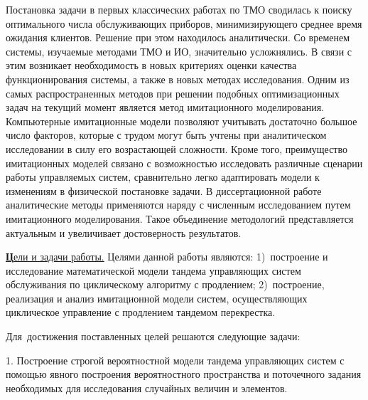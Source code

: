 \documentclass[14pt]{extarticle}
\newcommand{\progressTXT}{Степень разработанности темы.}
\newcommand{\aimTXT}{Цели и задачи работы.}
\newcommand{\tasksTXT}{задачи}
\newcommand{\noveltyTXT}{Научная новизна.}
\newcommand{\influenceTXT}{Теоретическая и практическая значимость.}
\newcommand{\methodsTXT}{Mетодология и методы исследования.}
\newcommand{\defpositionsTXT}{Основные положения, выносимые на~защиту.}
\newcommand{\reliabilityTXT}{Достоверность}
\newcommand{\probationTXT}{Степень достоверности и апробация результатов.}
\newcommand{\contributionTXT}{Личный вклад автора.}
\newcommand{\publicationsTXT}{Публикации.}
\theoremstyle{theorem}
\theoremstyle{remark}
\begin{document}
Постановка задачи в первых классических работах по ТМО сводилась к поиску оптимального числа обслуживающих приборов, минимизирующего среднее время ожидания клиентов. Решение при этом находилось аналитически. Со временем системы, изучаемые методами ТМО и ИО, значительно усложнялись. В связи с этим возникает необходимость в новых критериях оценки качества функционирования системы, а также в новых методах исследования. Одним из самых распространенных методов при решении подобных оптимизационных задач на текущий момент является метод имитационного моделирования. Компьютерные имитационные модели позволяют учитывать достаточно большое число факторов, которые с трудом могут быть учтены при аналитическом исследовании в силу его возрастающей сложности. Кроме того, преимущество имитационных моделей связано с возможностью исследовать различные сценарии работы управляемых систем, сравнительно легко адаптировать модели к изменениям в физической постановке задачи. В диссертационной работе аналитические методы применяются наряду с численным исследованием путем имитационного моделирования. Такое объединение методологий представляется актуальным и увеличивает достоверность результатов.
\newcommand{\progress}{\underline{\textbf{\progressTXT}}}
\newcommand{\aim}{\underline{{\textbf\aimTXT}}}
\newcommand{\tasks}{\underline{\textbf{\tasksTXT}}}
\newcommand{\novelty}{\underline{\textbf{\noveltyTXT}}}
\newcommand{\influence}{\underline{\textbf{\influenceTXT}}}
\newcommand{\methods}{\underline{\textbf{\methodsTXT}}}
\newcommand{\defpositions}{\underline{\textbf{\defpositionsTXT}}}
\newcommand{\reliability}{\underline{\textbf{\reliabilityTXT}}}
\newcommand{\probation}{\underline{\textbf{\probationTXT}}}
\newcommand{\contribution}{\underline{\textbf{\contributionTXT}}}
\newcommand{\publications}{\underline{\textbf{\publicationsTXT}}}


{\aim} Целями данной работы являются: 1)~построение и исследование математической модели тандема управляющих систем обслуживания по циклическому алгоритму с продлением; 2)~построение, реализация и анализ имитационной модели систем, осуществляющих циклическое управление с продлением тандемом перекрестка.

Для~достижения поставленных целей решаются следующие задачи:

1. Построение строгой вероятностной модели тандема управляющих систем с помощью явного построения вероятностного пространства и поточечного задания необходимых для исследования случайных величин и элементов.
\end{document}
